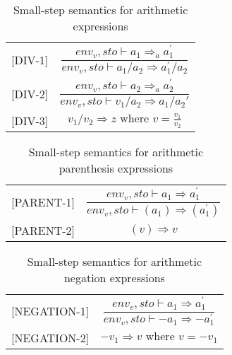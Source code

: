 \begin{table}[H]
    \centering
    \begin{longtable}[c] { r c }
        
        [DIV-1] & \( \dfrac{ env_v,sto \vdash a_1 \Rightarrow_a a^{'}_{1}}{env_v,sto \vdash a_1 / a_2 \Rightarrow a^{'}_{1} / a_2} \) \\
        
        [DIV-2] & \( \dfrac{ env_v,sto \vdash a_2 \Rightarrow_a a^{'}_{2}}{env_v,sto \vdash v_1 / a_2 \Rightarrow a_{1} / a_2{'}} \) \\
        
        
        [DIV-3] & \(v_1 / v_2 \Rightarrow z \text{ where } v = \frac{v_1}{v_2}\) \\
        
    \end{longtable}
    \caption{Small-step semantics for arithmetic expressions}
\end{table}
        \begin{table}[H]
    \centering
    \begin{longtable}[c] { r c }
        [PARENT-1] & \( \dfrac{env_v,sto \vdash a_1 \Rightarrow a^{'}_{1}}{env_v,sto \vdash (a_1) \Rightarrow (a^{'}_{1})} \) \\
        
        [PARENT-2] & \( (v) \Rightarrow v \) \\
        
    \end{longtable}
    \caption{Small-step semantics for arithmetic parenthesis expressions}
\end{table}
\begin{table}[H]
    \centering
    \begin{longtable}[c] { r c }
        
        [NEGATION-1] & \( \dfrac{env_v,sto \vdash a_1 \Rightarrow a^{'}_{1}}{env_v,sto \vdash -a_1 \Rightarrow -a^{'}_{1}} \) \\
        
        [NEGATION-2] & \( -v_1 \Rightarrow v \text{ where } v = -v_1 \)\\
        
    \end{longtable}
    \caption{Small-step semantics for arithmetic negation expressions}
\end{table}

\iffalse
Don't think we need intger only when we got Num and var??
\begin{table}[H]
    \centering
    \begin{longtable}[c] { r c }
        
        [INT-1] & \( n \Rightarrow z \text{ if } \mathbb{Z}[[n]] = z \) \\
        
        [INT-2] & \( v \Rightarrow z \text{ if } v \in \mathbb{Z} \)\\
        
    \end{longtable}
    \caption{Small-step semantics for arithmetic integer expressions}
\end{table}
\fi

